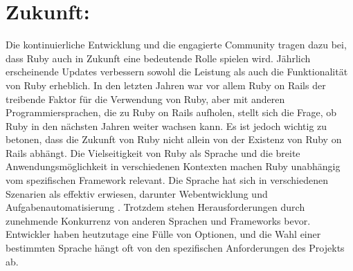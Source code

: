 \documentclass{article}
\begin{document}
\section*{Zukunft:} 
Die kontinuierliche Entwicklung und die engagierte Community tragen dazu bei, dass Ruby auch in Zukunft eine bedeutende Rolle spielen wird. Jährlich erscheinende Updates verbessern sowohl die Leistung als auch die Funktionalität von Ruby erheblich.
In den letzten Jahren war vor allem Ruby on Rails der treibende Faktor für die Verwendung von Ruby, aber mit anderen Programmiersprachen, die zu Ruby on Rails aufholen, stellt sich die Frage, ob Ruby in den nächsten Jahren weiter wachsen kann. Es ist jedoch wichtig zu betonen, dass die Zukunft von Ruby nicht allein von der Existenz von Ruby on Rails abhängt.
Die Vielseitigkeit von Ruby als Sprache und die breite Anwendungsmöglichkeit in verschiedenen Kontexten machen Ruby unabhängig vom spezifischen Framework relevant. Die Sprache hat sich in verschiedenen Szenarien als effektiv erwiesen, darunter Webentwicklung und Aufgabenautomatisierung .
Trotzdem stehen Herausforderungen durch zunehmende Konkurrenz von anderen Sprachen und Frameworks bevor. Entwickler haben heutzutage eine Fülle von Optionen, und die Wahl einer bestimmten Sprache hängt oft von den spezifischen Anforderungen des Projekts ab.
\end{document}
